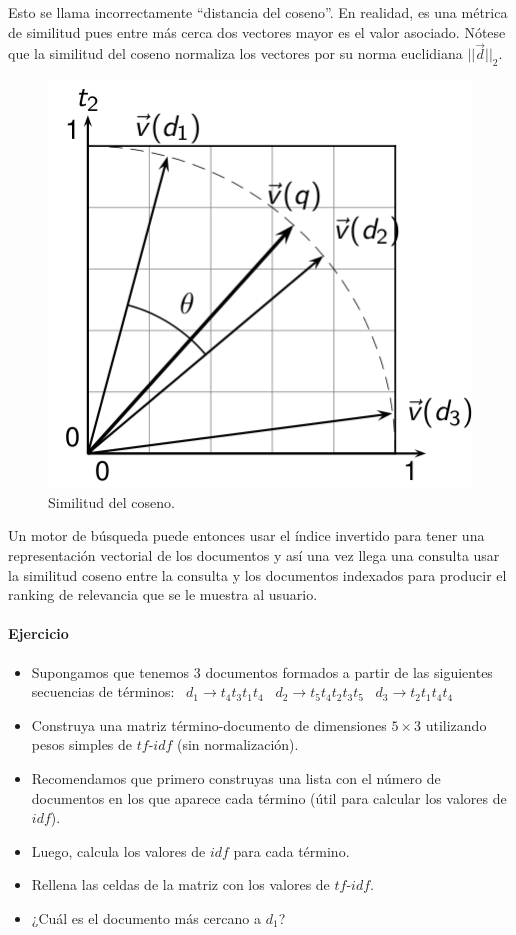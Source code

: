 Esto se llama incorrectamente ``distancia del coseno''. En realidad, es una métrica de similitud pues entre más cerca dos vectores mayor es el valor asociado. Nótese que la similitud del coseno normaliza los vectores por su norma euclidiana $||\vec{d}||_{2}$.

\begin{figure}[h!]
\centering
\includegraphics[scale=0.5]{pics/cos.png}
\caption{Similitud del coseno.}
\end{figure}

Un motor de búsqueda puede entonces usar el índice invertido para tener una representación vectorial de los documentos y así una vez llega una consulta usar la similitud coseno entre la consulta y los documentos indexados para producir el ranking de relevancia que se le muestra al usuario.

\paragraph{Ejercicio}
\begin{itemize}
\item Supongamos que tenemos $3$ documentos formados a partir de las siguientes secuencias de términos: \
$d_{1}\rightarrow t_{4}t_{3}t_{1}t_{4}$ \
$d_{2}\rightarrow t_{5}t_{4}t_{2}t_{3}t_{5}$ \
$d_{3}\rightarrow t_{2}t_{1}t_{4}t_{4}$ \
\item Construya una matriz término-documento de dimensiones $5\times3$ utilizando pesos simples de $tf$-$idf$ (sin normalización).
\item Recomendamos que primero construyas una lista con el número de documentos en los que aparece cada término (útil para calcular los valores de $idf$).
\item Luego, calcula los valores de $idf$ para cada término.
\item Rellena las celdas de la matriz con los valores de $tf$-$idf$.
\item ¿Cuál es el documento más cercano a $d_{1}$?
\end{itemize}

